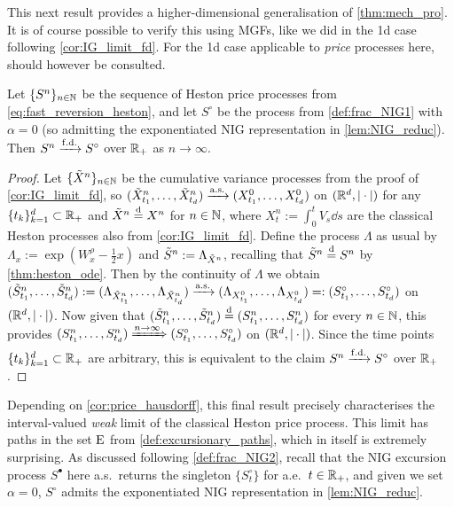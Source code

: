 This next result provides a higher-dimensional generalisation of \autoref{thm:mech_pro}. It is of course possible to verify this using MGFs, like we did in the 1d case following \autoref{cor:IG_limit_fd}. For the 1d case applicable to \emph{price} processes here, \cite{mechkov_2015} should however be consulted.

\begin{corollary}\label{cor:heston_fd}
    Let $\{S^n\}_{n\in\mathbb{N}}$ be the sequence of Heston price processes from \autoref{eq:fast_reversion_heston}, and let $S^\circ$ be the process from \autoref{def:frac_NIG1} with $\alpha=0$ (so admitting the exponentiated NIG representation in \autoref{lem:NIG_reduc}). Then $S^n\xrightarrow{\mathrm{f.d.}} S^\circ$ over $\mathbb{R}_+$ as $n\to\infty$.
\end{corollary}
\begin{proof}
    Let $\{\tilde{X}^n\}_{n\in\mathbb{N}}$ be the cumulative variance processes from the proof of \autoref{cor:IG_limit_fd}, so $(\tilde{X}^n_{t_1},\dots,\tilde{X}^n_{t_d})\xrightarrow{\mathrm{a.s.}}(X^0_{t_1},\dots,X^0_{t_d})$ on $(\mathbb{R}^d,|\cdot|)$ for any $\{t_k\}_{k=1}^d\subset\mathbb{R}_+$ and $\tilde{X}^n\stackrel{\mathrm{d}}{=} X^n$ for $n\in\mathbb{N}$, where $X^n_t:=\int_0^t V_s\dd s$ are the classical Heston processes also from \autoref{cor:IG_limit_fd}. Define the process $\Lambda$ as usual by $\Lambda_x:=\exp(W^\rho_x-\frac12 x)$ and $\tilde{S}^n:=\Lambda_{\tilde{X}^n}$, recalling that $\tilde{S}^n\stackrel{\mathrm{d}}{=} S^n$ by \autoref{thm:heston_ode}. Then by the continuity of $\Lambda$ we obtain $(\tilde{S}^n_{t_1},\dots,\tilde{S}^n_{t_d}) := (\Lambda_{\tilde{X}^n_{t_1}},\dots,\Lambda_{\tilde{X}^n_{t_d}})\xrightarrow{\mathrm{a.s.}}(\Lambda_{X^0_{t_1}},\dots,\Lambda_{X^0_{t_d}}) =: (S^\circ_{t_1},\dots,S^\circ_{t_d})$ on $(\mathbb{R}^d,|\cdot|)$. Now given that $(\tilde{S}^n_{t_1},\dots,\tilde{S}^n_{t_d})\stackrel{\mathrm{d}}{=}(S^n_{t_1},\dots,S^n_{t_d})$ for every $n\in\mathbb{N}$, this provides $(S^n_{t_1},\dots,S^n_{t_d}) \xRightarrow{n\to\infty}(S^\circ_{t_1},\dots,S^\circ_{t_d})$ on $(\mathbb{R}^d,|\cdot|)$. Since the time points $\{t_k\}_{k=1}^d\subset\mathbb{R}_+$ are arbitrary, this is equivalent to the claim $S^n\xrightarrow{\mathrm{f.d.}} S^\circ$ over $\mathbb{R}_+$.
\end{proof}

Depending on \autoref{cor:price_hausdorff}, this final result precisely characterises the interval-valued \emph{weak} limit of the classical Heston price process. This limit has paths in the set $\mathrm{E}$ from \autoref{def:excursionary_paths}, which in itself is extremely surprising. As discussed following \autoref{def:frac_NIG2}, recall that the NIG excursion process $S^\bullet$ here a.s.~returns the singleton $\{S^\circ_t\}$ for a.e.~$t\in\mathbb{R}_+$, and given we set $\alpha=0$, $S^\circ$ admits the exponentiated NIG representation in \autoref{lem:NIG_reduc}.

